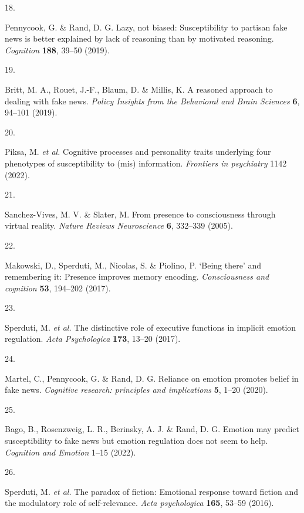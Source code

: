 \documentclass[
  man,floatsintext]{apa6}
\newlength{\cslhangindent}
\newlength{\csllabelwidth}
\newlength{\cslentryspacingunit} %
\newenvironment{CSLReferences}[2] %
 {%
  \setlength{\parindent}{0pt}
  \ifodd #1
  \let\oldpar\par
  \def\par{\hangindent=\cslhangindent\oldpar}
  \fi
  \setlength{\parskip}{#2\cslentryspacingunit}
 }%
 {}
\newcommand{\CSLLeftMargin}[1]{\parbox[t]{\csllabelwidth}{#1}}
\newcommand{\CSLRightInline}[1]{\parbox[t]{\linewidth - \csllabelwidth}{#1}\break}
\begin{document}
\begin{CSLReferences}{0}{0}
\leavevmode{}%
\CSLLeftMargin{18. }%
\CSLRightInline{Pennycook, G. \& Rand, D. G. Lazy, not biased: Susceptibility to partisan fake news is better explained by lack of reasoning than by motivated reasoning. \emph{Cognition} \textbf{188}, 39--50 (2019).}

\leavevmode{}%
\CSLLeftMargin{19. }%
\CSLRightInline{Britt, M. A., Rouet, J.-F., Blaum, D. \& Millis, K. A reasoned approach to dealing with fake news. \emph{Policy Insights from the Behavioral and Brain Sciences} \textbf{6}, 94--101 (2019).}

\leavevmode{}%
\CSLLeftMargin{20. }%
\CSLRightInline{Piksa, M. \emph{et al.} Cognitive processes and personality traits underlying four phenotypes of susceptibility to (mis) information. \emph{Frontiers in psychiatry} 1142 (2022).}

\leavevmode{}%
\CSLLeftMargin{21. }%
\CSLRightInline{Sanchez-Vives, M. V. \& Slater, M. From presence to consciousness through virtual reality. \emph{Nature Reviews Neuroscience} \textbf{6}, 332--339 (2005).}

\leavevmode{}%
\CSLLeftMargin{22. }%
\CSLRightInline{Makowski, D., Sperduti, M., Nicolas, S. \& Piolino, P. {`Being there'} and remembering it: Presence improves memory encoding. \emph{Consciousness and cognition} \textbf{53}, 194--202 (2017).}

\leavevmode{}%
\CSLLeftMargin{23. }%
\CSLRightInline{Sperduti, M. \emph{et al.} The distinctive role of executive functions in implicit emotion regulation. \emph{Acta Psychologica} \textbf{173}, 13--20 (2017).}

\leavevmode{}%
\CSLLeftMargin{24. }%
\CSLRightInline{Martel, C., Pennycook, G. \& Rand, D. G. Reliance on emotion promotes belief in fake news. \emph{Cognitive research: principles and implications} \textbf{5}, 1--20 (2020).}

\leavevmode{}%
\CSLLeftMargin{25. }%
\CSLRightInline{Bago, B., Rosenzweig, L. R., Berinsky, A. J. \& Rand, D. G. Emotion may predict susceptibility to fake news but emotion regulation does not seem to help. \emph{Cognition and Emotion} 1--15 (2022).}

\leavevmode{}%
\CSLLeftMargin{26. }%
\CSLRightInline{Sperduti, M. \emph{et al.} The paradox of fiction: Emotional response toward fiction and the modulatory role of self-relevance. \emph{Acta psychologica} \textbf{165}, 53--59 (2016).}


\end{CSLReferences}
\end{document}

